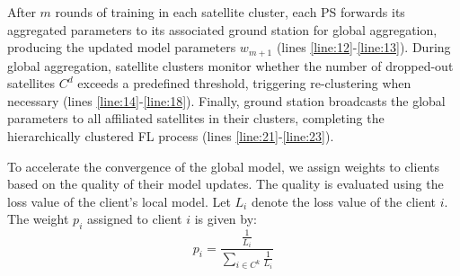 After $m$ rounds of training in each satellite cluster, each PS forwards its aggregated parameters to its associated ground station for global aggregation, producing the updated model parameters $w_{m+1}$ (lines \ref{line:12}-\ref{line:13}). During global aggregation, satellite clusters monitor whether the number of dropped-out satellites $C^d$ exceeds a predefined threshold, triggering re-clustering when necessary (lines \ref{line:14}-\ref{line:18}). Finally, ground station broadcasts the global parameters to all affiliated satellites in their clusters, completing the hierarchically clustered FL process (lines \ref{line:21}-\ref{line:23}). 





To accelerate the convergence of the global model, we assign weights to clients based on the quality of their model updates. The quality is evaluated using the loss value of the client's local model. Let $L_i$ denote the loss value of the client $i$. The weight $p_i$ assigned to client $i$ is given by:
\begin{equation}
p_i = \frac{\frac{1}{L_i}}{\sum_{ i \in C^k} \frac{1}{L_i}}
\label{eq:p}
\end{equation}

